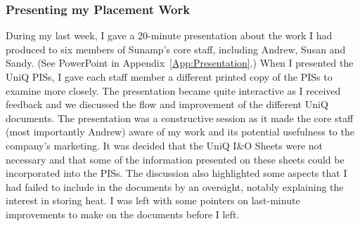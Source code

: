 




\subsubsection{Presenting my Placement Work}

During my last week, I gave a 20-minute presentation about the work I had produced to six members of Sunamp's core staff, including Andrew, Susan and Sandy.
(See PowerPoint in Appendix~\ref{App:Presentation}.)
When I presented the UniQ PISs, I gave each staff member a different printed copy of the PISs to examine more closely.
The presentation became quite interactive as I received feedback and we discussed the flow and improvement of the different UniQ documents.
The presentation was a constructive session as it made the core staff (most importantly Andrew) aware of my work and its potential usefulness to the company's marketing.
It was decided that the UniQ I\&O Sheets were not necessary and that some of the information presented on these sheets could be incorporated into the PISs.
The discussion also highlighted some aspects that I had failed to include in the documents by an oversight, notably explaining the interest in storing heat.
I was left with some pointers on last-minute improvements to make on the documents before I left.



